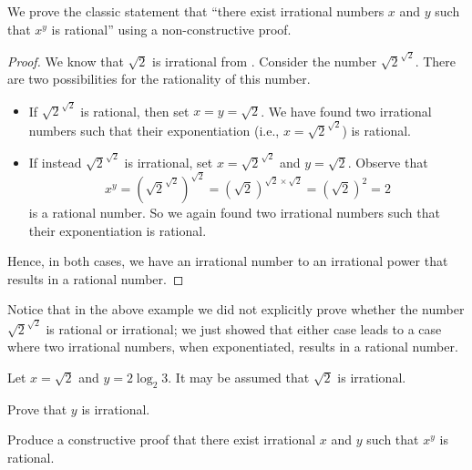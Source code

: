 \begin{example}
    \setlength{\parindent}{1.5em}

    We prove the classic statement that ``there exist irrational numbers $x$ and $y$ such that $x^y$ is rational'' using a non-constructive proof.
    \begin{proof}
        We know that $\sqrt2$ is irrational from . Consider the number $\sqrt2^{\sqrt2}$. There are two possibilities for the rationality of this number.
        \begin{itemize}
            \item If $\sqrt2^{\sqrt2}$ is rational, then set $x = y = \sqrt2$. We have found two irrational numbers such that their exponentiation (i.e.,  $x = \sqrt2^{\sqrt2}$) is rational.
            \item If instead $\sqrt2^{\sqrt2}$ is irrational, set $x = \sqrt2^{\sqrt2}$ and $y = \sqrt2$. Observe that
            \[
                x^y = \left(\sqrt2^{\sqrt2}\right)^{\sqrt2} = (\sqrt2)^{\sqrt2 \times \sqrt2} = (\sqrt2)^2 = 2
            \]
            is a rational number. So we again found two irrational numbers such that their exponentiation is rational.
        \end{itemize}
        Hence, in both cases, we have an irrational number to an irrational power that results in a rational number.
    \end{proof}
\end{example}

Notice that in the above example we did not explicitly prove whether the number $\sqrt2^{\sqrt2}$ is rational or irrational; we just showed that either case leads to a case where two irrational numbers, when exponentiated, results in a rational number.

\begin{exercise}
    Let $x = \sqrt2$ and $y = 2\log_2{3}$. It may be assumed that $\sqrt2$ is irrational.
    \begin{partquestions}{\roman*}
        \item Prove that $y$ is irrational.
        \item Produce a constructive proof that there exist irrational $x$ and $y$ such that $x^y$ is rational.
    \end{partquestions}
\end{exercise}
